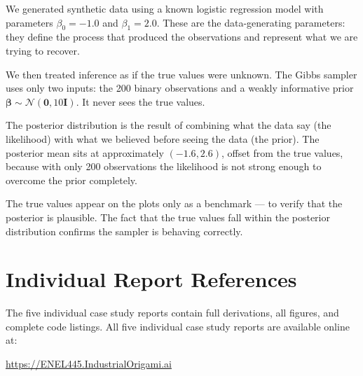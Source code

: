 \documentclass[11pt,a4paper]{article}
\newcommand{\N}{\mathcal{N}}
\begin{document}
\begin{framed}
\noindent
We generated synthetic data using a known logistic regression model with parameters
$\beta_0 = -1.0$ and $\beta_1 = 2.0$.
These are the data-generating parameters: they define the process that produced the
observations and represent what we are trying to recover.

We then treated inference as if the true values were unknown.
The Gibbs sampler uses only two inputs: the 200 binary observations and a weakly
informative prior $\bm{\beta} \sim \N(\bm{0}, 10\bm{I})$.
It never sees the true values.

The posterior distribution is the result of combining what the data say (the likelihood)
with what we believed before seeing the data (the prior).
The posterior mean sits at approximately $(-1.6, 2.6)$, offset from the true values,
because with only 200 observations the likelihood is not strong enough to overcome
the prior completely.

The true values appear on the plots only as a benchmark --- to verify that the posterior
is plausible.
The fact that the true values fall within the posterior distribution confirms the sampler
is behaving correctly.
\end{framed}

\section{Individual Report References}
\label{app:individual-refs}

The five individual case study reports contain full derivations, all figures, and
complete code listings. All five individual case study reports are available online at:
\begin{center}
  \url{https://ENEL445.IndustrialOrigami.ai}
\end{center}
\end{document}
